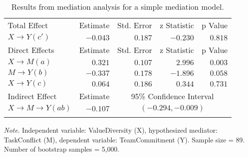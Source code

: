 \documentclass{article}
\begin{document}


\begin{table}[h!]
\caption{Results from mediation analysis for a simple mediation model.}
\begin{center}
\begin{tabular}{lrrrr}
\hline\noalign{\smallskip}
Total Effect & Estimate & Std. Error & z Statistic & p Value \\
\noalign{\smallskip}\hline\noalign{\smallskip}
$X \rightarrow Y (c')$ & $-0.043$ & $0.187$ & $-0.230$ & $0.818$ \\
\noalign{\smallskip}\hline\noalign{\smallskip}
Direct Effects & Estimate & Std. Error & z Statistic & p Value \\
\noalign{\smallskip}\hline\noalign{\smallskip}
$X \rightarrow M (a)$ & $0.321$ & $0.107$ & $2.996$ & $0.003$ \\
$M \rightarrow Y (b)$ & $-0.337$ & $0.178$ & $-1.896$ & $0.058$ \\
$X \rightarrow Y (c)$ & $0.064$ & $0.186$ & $0.344$ & $0.731$ \\
\noalign{\smallskip}\hline\noalign{\smallskip}
Indirect Effect & Estimate & \multicolumn{3}{c}{95\% Confidence Interval} \\
\noalign{\smallskip}\hline\noalign{\smallskip}
$X \rightarrow M \rightarrow Y (ab)$ & $-0.107$ & \multicolumn{3}{c}{$(-0.294, -0.009)$} \\
\noalign{\smallskip}\hline
\end{tabular}
\end{center}
\emph{Note}. Independent variable: ValueDiversity (X), hypothesized mediator: TaskConflict (M), dependent variable: TeamCommitment (Y). Sample size = 89. Number of bootstrap samples = 5,000.
\end{table}



% 
\end{document}

